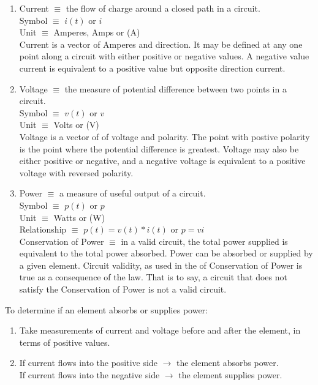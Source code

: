 \documentclass{article}
\begin{document}
\begin{enumerate}
  \item {
  Current $\equiv$ the flow of charge around a closed path in a circuit.\\
  Symbol $\equiv$ $i(t)$ or $i$\\
  Unit $\equiv$ Amperes, Amps or (A)\\
  Current is a vector of Amperes and direction. It may be defined at any one point along a circuit with either positive or negative values. A negative value current is equivalent to a positive value but opposite direction current.
  }
  \item {
  Voltage $\equiv$ the measure of potential difference between two points in a circuit.\\
  Symbol $\equiv$ $v(t)$ or $v$\\
  Unit $\equiv$ Volts or (V)\\
  Voltage is a vector of of voltage and polarity. The point with postive polarity is the point where the potential difference is greatest. Voltage may also be either positive or negative, and a negative voltage is equivalent to a positive voltage with reversed polarity.
  }
  \item {
  Power $\equiv$ a measure of useful output of a circuit.\\
  Symbol $\equiv$ $p(t)$ or $p$\\
  Unit $\equiv$ Watts or (W)\\
  Relationship $\equiv$ $p(t) = v(t) * i(t)$ or $p = vi$\\
  Conservation of Power $\equiv$ in a valid circuit, the total power supplied is equivalent to the total power absorbed.
  Power can be absorbed or supplied by a given element. Circuit validity, as used in the of Conservation of Power is true as a consequence of the law. That is to say, a circuit that does not satisfy the Conservation of Power is not a valid circuit.
  }
\end{enumerate}

\noindent
To determine if an element absorbs or supplies power:
\begin{enumerate}
  \item Take measurements of current and voltage before and after the element, in terms of positive values.
  \item {
  If current flows into the positive side $\to$ the element absorbs power.\\
  If current flows into the negative side $\to$ the element supplies power.
  }
\end{enumerate}
\end{document}
